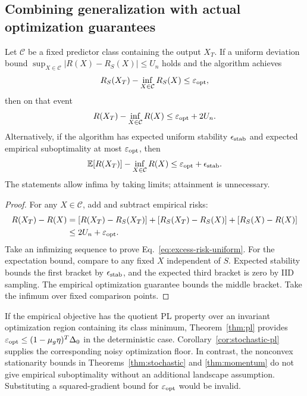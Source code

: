 \subsection{Combining generalization with actual optimization guarantees}
\begin{theorem}
\label{thm:excess-risk}
Let $\mathcal C$ be a fixed predictor class containing the output $X_T$.
If a uniform deviation bound
$\sup_{X\in\mathcal C}|R(X)-R_S(X)|\leq U_n$ holds and the algorithm
achieves
\begin{equation}
 R_S(X_T)-\inf_{X\in\mathcal C}R_S(X)\leq\varepsilon_{\rm opt},
\end{equation}
then on that event
\begin{equation}
 R(X_T)-\inf_{X\in\mathcal C}R(X)
           \leq\varepsilon_{\rm opt}+2U_n.
 \label{eq:excess-risk-uniform}
\end{equation}
Alternatively, if the algorithm has expected uniform stability
$\epsilon_{\rm stab}$ and expected empirical suboptimality at most
$\varepsilon_{\rm opt}$, then
\begin{equation}
 \mathbb E[R(X_T)]-\inf_{X\in\mathcal C}R(X)
           \leq\varepsilon_{\rm opt}+\epsilon_{\rm stab}.
 \label{eq:excess-risk-stable}
\end{equation}
The statements allow infima by taking limits; attainment is unnecessary.
\end{theorem}
\begin{proof}
For any $X\in\mathcal C$, add and subtract empirical risks:
\begin{align}
 R(X_T)-R(X)
 &=[R(X_T)-R_S(X_T)]+[R_S(X_T)-R_S(X)]
                         +[R_S(X)-R(X)]\\
 &\leq2U_n+\varepsilon_{\rm opt}.
\end{align}
Take an infimizing sequence to prove Eq.~\eqref{eq:excess-risk-uniform}.
For the expectation bound, compare to any fixed $X$ independent of $S$.
Expected stability bounds the first bracket by $\epsilon_{\rm stab}$,
and the expected third bracket is zero by IID sampling. The empirical
optimization guarantee bounds the middle bracket. Take the infimum over
fixed comparison points.
\end{proof}

If the empirical objective has the quotient PL property over an invariant
optimization region containing its class minimum, Theorem~\ref{thm:pl}
provides $\varepsilon_{\rm opt}\leq(1-\mu_g\eta)^T\Delta_0$ in the
deterministic case. Corollary~\ref{cor:stochastic-pl} supplies the
corresponding noisy optimization floor. In contrast, the nonconvex
stationarity bounds in Theorems~\ref{thm:stochastic} and
\ref{thm:momentum} do not give empirical suboptimality without an
additional landscape assumption. Substituting a squared-gradient bound
for $\varepsilon_{\rm opt}$ would be invalid.

